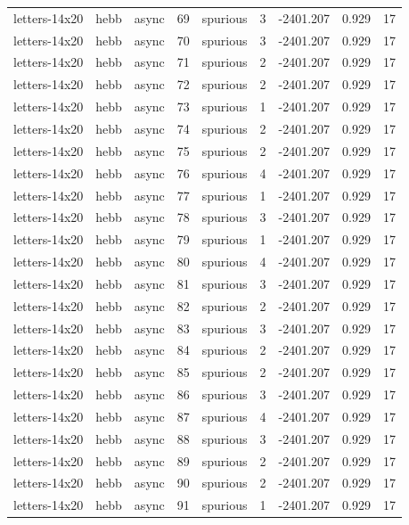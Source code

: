 \begin{tabular}{lllrlrrrr}
letters-14x20 & hebb & async & 69 & spurious & 3 & -2401.207 & 0.929 & 17 \\
letters-14x20 & hebb & async & 70 & spurious & 3 & -2401.207 & 0.929 & 17 \\
letters-14x20 & hebb & async & 71 & spurious & 2 & -2401.207 & 0.929 & 17 \\
letters-14x20 & hebb & async & 72 & spurious & 2 & -2401.207 & 0.929 & 17 \\
letters-14x20 & hebb & async & 73 & spurious & 1 & -2401.207 & 0.929 & 17 \\
letters-14x20 & hebb & async & 74 & spurious & 2 & -2401.207 & 0.929 & 17 \\
letters-14x20 & hebb & async & 75 & spurious & 2 & -2401.207 & 0.929 & 17 \\
letters-14x20 & hebb & async & 76 & spurious & 4 & -2401.207 & 0.929 & 17 \\
letters-14x20 & hebb & async & 77 & spurious & 1 & -2401.207 & 0.929 & 17 \\
letters-14x20 & hebb & async & 78 & spurious & 3 & -2401.207 & 0.929 & 17 \\
letters-14x20 & hebb & async & 79 & spurious & 1 & -2401.207 & 0.929 & 17 \\
letters-14x20 & hebb & async & 80 & spurious & 4 & -2401.207 & 0.929 & 17 \\
letters-14x20 & hebb & async & 81 & spurious & 3 & -2401.207 & 0.929 & 17 \\
letters-14x20 & hebb & async & 82 & spurious & 2 & -2401.207 & 0.929 & 17 \\
letters-14x20 & hebb & async & 83 & spurious & 3 & -2401.207 & 0.929 & 17 \\
letters-14x20 & hebb & async & 84 & spurious & 2 & -2401.207 & 0.929 & 17 \\
letters-14x20 & hebb & async & 85 & spurious & 2 & -2401.207 & 0.929 & 17 \\
letters-14x20 & hebb & async & 86 & spurious & 3 & -2401.207 & 0.929 & 17 \\
letters-14x20 & hebb & async & 87 & spurious & 4 & -2401.207 & 0.929 & 17 \\
letters-14x20 & hebb & async & 88 & spurious & 3 & -2401.207 & 0.929 & 17 \\
letters-14x20 & hebb & async & 89 & spurious & 2 & -2401.207 & 0.929 & 17 \\
letters-14x20 & hebb & async & 90 & spurious & 2 & -2401.207 & 0.929 & 17 \\
letters-14x20 & hebb & async & 91 & spurious & 1 & -2401.207 & 0.929 & 17 \\

\end{tabular}
